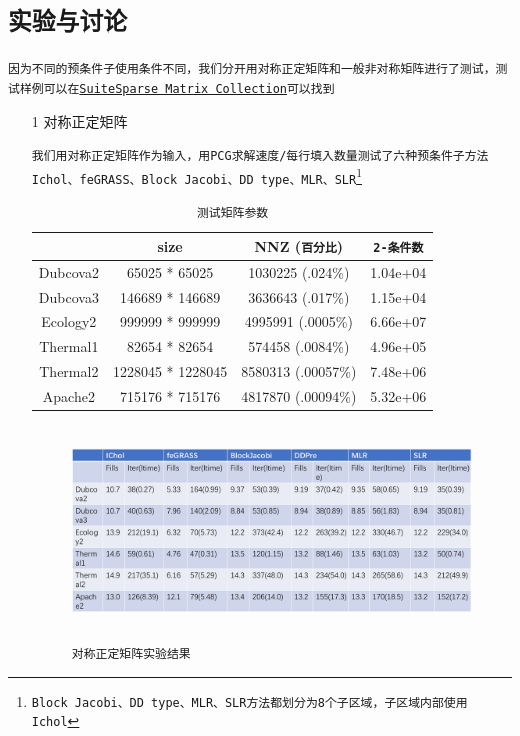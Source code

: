 \documentclass[11pt, a4paper]{article}
\theoremstyle{plain}
\theoremstyle{plain}
\theoremstyle{plain}
\theoremstyle{definition}
\theoremstyle{remark}
\theoremstyle{definition}
\newcommand{\T}[1]{\texttt{#1}}
\begin{document}
\section*{\T{实验与讨论}}
\T{因为不同的预条件子使用条件不同，我们分开用对称正定矩阵和一般非对称矩阵进行了测试，测试样例可以在\href{http://sparse.tamu.edu/}{SuiteSparse Matrix Collection}可以找到\cite{Test}}
\begin{itemize}
	\item[1] 对称正定矩阵
	
	\T{我们用对称正定矩阵作为输入，用PCG求解速度/每行填入数量测试了六种预条件子方法Ichol、feGRASS、Block Jacobi、DD type、MLR、SLR\footnote{Block Jacobi、DD type、MLR、SLR方法都划分为8个子区域，子区域内部使用Ichol}}
	
	\begin{center}
		\begin{table}[H]
			\caption{\T{测试矩阵参数}}
			\begin{center}
				\begin{tabular}{ c|c|c|c}
					& size & NNZ (\T{百分比}) & \T{2-条件数} \\
					\hline
					Dubcova2 & 65025 * 65025 & 1030225 (.024\%) & 1.04e+04 \\
					\hline
					Dubcova3 & 146689 * 146689 & 3636643 (.017\%) & 1.15e+04 \\
					\hline
					Ecology2 & 999999 * 999999 & 4995991 (.0005\%) & 6.66e+07 \\
					\hline
					Thermal1 & 82654 * 82654 & 574458 (.0084\%) & 4.96e+05	\\
					\hline
					Thermal2 & 1228045 * 1228045 & 8580313 (.00057\%) & 7.48e+06 \\
					\hline
					Apache2 & 715176 * 715176 & 4817870 (.00094\%) & 5.32e+06 \\											
				\end{tabular}
			\end{center}
		\end{table}
	\end{center}
	
	\begin{figure}[H]
		\caption{\T{对称正定矩阵实验结果}}
		\centering
		\includegraphics[width=350pt,height=160pt]{SPD_res.png}
	\end{figure}



\end{itemize}
\end{document}

